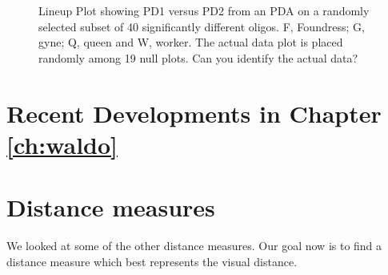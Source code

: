 \documentclass[12]{report}
\begin{document}
\begin{figure}[hbtp]
   \centering
       \caption{Lineup Plot showing PD1 versus PD2 from an PDA on a randomly selected subset of 40 significantly different oligos. F, Foundress; G, gyne; Q, queen and W, worker. The actual data plot is placed randomly among 19 null plots. Can you identify the actual data?  }
       \label{toth_pda}
\end{figure}   


\section{Recent Developments in Chapter \ref{ch:waldo}}

\section{Distance measures}

We looked at some of the other distance measures. Our goal now is to find a distance measure which best represents the visual distance.
\end{document}
